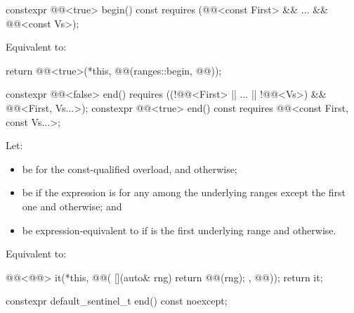 \begin{itemdecl}
constexpr @@<true> begin() const
  requires (@@<const First> && ... && @@<const Vs>);
\end{itemdecl}

\begin{itemdescr}
\pnum
\effects
Equivalent to:
\begin{codeblock}
return @@<true>(*this, @@(ranges::begin, @@));
\end{codeblock}
\end{itemdescr}

\begin{itemdecl}
constexpr @@<false> end()
  requires ((!@@<First> || ... || !@@<Vs>)
    && @@<First, Vs...>);
constexpr @@<true> end() const
  requires @@<const First, const Vs...>;
\end{itemdecl}

\begin{itemdescr}
\pnum
Let:
\begin{itemize}
\item
{} be  for the const-qualified overload, and
 otherwise;
\item
{} be 
if the expression  is 
for any  among the underlying ranges except the first one and
 otherwise; and
\item
{} be expression-equivalent to
if  is the first underlying range and
 otherwise.
\end{itemize}

\pnum
\effects
Equivalent to:
\begin{codeblock}
@@<@@> it(*this, @@(
  [](auto& rng){ return @@(rng); }, @@));
return it;
\end{codeblock}
\end{itemdescr}

\begin{itemdecl}
constexpr default_sentinel_t end() const noexcept;
\end{itemdecl}

